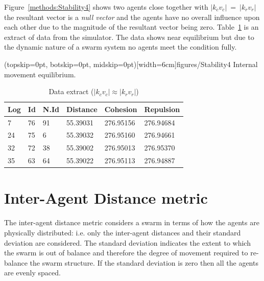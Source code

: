 \documentclass{ieeeaccess}
\begin{document}
Figure~\ref{methods:Stability4} shows two agents close together with $|k_cv_c|~=~|k_rv_r|$ the resultant vector is a \textit{null vector} and the agents have no overall influence upon each other due to the magnitude of the resultant vector being zero. Table~\ref{tab:SampleEquilibrium} is an extract of data from the simulator. The data shows near equilibrium but due to the dynamic nature of a swarm system no agents meet the condition fully. 

\Figure[t!](topskip=0pt, botskip=0pt, midskip=0pt)[width=6cm]{figures/Stability4}
{Internal movement equilibrium.\label{methods:Stability4}}


\begin{table}[H]
\begin{center}
\begin{tabular}{| l | l | l | l | l | l |}
\hline
Log &	Id &	N.Id &	Distance &	{\color{green}Cohesion} &	{\color{red}Repulsion} 	\\ \hline
7 & 76 &	91 & 55.39031 & {\color{green}276.95156} & {\color{red}276.94684} \\ \hline
24 & 75 & 6 & 55.39032 & {\color{green}276.95160} & {\color{red}276.94661} \\ \hline
32 & 72 & 38 &	55.39002 & {\color{green}276.95013} & {\color{red}276.95370} \\ \hline
35 & 63 & 64 & 55.39022 &	{\color{green}276.95113} &	{\color{red}276.94887} \\
\hline
\end{tabular}\caption{Data extract ($|k_cv_c| \approx |k_rv_r|$)} \label{tab:SampleEquilibrium}
\end{center}
\end{table} 

\section{Inter-Agent Distance metric}\label{Section:DistanceDynamics}
The inter-agent distance metric considers a swarm in terms of how the agents are physically distributed: i.e. only the inter-agent distances and their standard deviation are considered. The standard deviation indicates the extent to which the swarm is out of balance and therefore the degree of movement required to re-balance the swarm structure. If the standard deviation is zero then all the agents are evenly spaced. 
\end{document}
